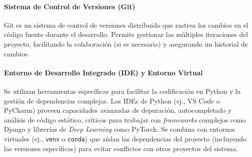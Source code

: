 \paragraph{Sistema de Control de Versiones (Git)}
Git es un sistema de control de versiones distribuido que rastrea los cambios en el código fuente durante el desarrollo. Permite gestionar las múltiples iteraciones del proyecto, facilitando la colaboración (si es necesaria) y asegurando un historial de cambios.

\paragraph{Entorno de Desarrollo Integrado (IDE) y Entorno Virtual}
Se utilizan herramientas específicas para facilitar la codificación en Python y la gestión de dependencias complejas. Los IDEs de Python (ej., VS Code o PyCharm) proveen capacidades avanzadas de depuración, autocompletado y análisis de código estático, críticos para trabajar con \textit{frameworks} complejos como Django y librerías de \textit{Deep Learning} como PyTorch. Se combina con entornos virtuales (ej., \texttt{venv} o \texttt{conda}) que aíslan las dependencias del proyecto (incluyendo las versiones específicas) para evitar conflictos con otros proyectos del sistema.

